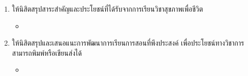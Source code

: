 \documentclass{article}
\begin{document}
\flushleft
\renewcommand{\labelenumii}{\arabic{enumii})}

\begin{enumerate}
        \item ให้นิสิตสรุปสาระสำคัญและประโยชน์ที่ได้รับจากการเรียนวิชาสุขภาพเพื่อชีวิต

        \begin{itemize}
            \item 
        
        \end{itemize}

        \item ให้นิสิตสรุปและเสนอแนะการพัฒนาการเรียนการสอนที่พึงประสงค์ เพื่อประโยชน์ทางวิชาการ \\
        สามารถพิมพ์หรือเขียนส่งได้
    
        \begin{itemize}
            \item

        \end{itemize}

\end{enumerate}
\end{document}
